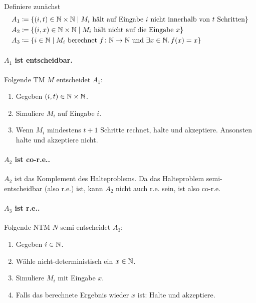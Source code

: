 
Definiere zunächst
\begin{align*}
  A_1 & \coloneqq \{ (i,t) \in \mathbb{N} \times \mathbb{N} \mid M_i\ \text{hält auf Eingabe}\ i\ \text{nicht innerhalb von}\ t\ \text{Schritten} \} \\
  A_2 & \coloneqq \{ (i,x) \in \mathbb{N} \times \mathbb{N} \mid M_i\ \text{hält nicht auf die Eingabe}\ x\} \\
  A_3 & \coloneqq \{ i \in \mathbb{N} \mid M_i\ \text{berechnet}\ f
        \colon \mathbb{N} \to \mathbb{N}\ \text{und}\ \exists x \in
        \mathbb{N} .\, f(x) = x \}
\end{align*}

\paragraph{$A_1$ ist entscheidbar.}
Folgende TM $M$ entscheidet $A_1$:
\begin{enumerate}
	\item
		Gegeben $(i,t) \in \mathbb{N} \times \mathbb{N}$.
	\item
		Simuliere $M_i$ auf Eingabe $i$.
	\item
		Wenn $M_i$ mindestens $t+1$ Schritte rechnet, halte und
		akzeptiere. Ansonsten halte und akzeptiere nicht.
\end{enumerate}
\par

\paragraph{$A_2$ ist co-r.e..}
$A_2$ ist das Komplement des Halteproblems. Da das Halteproblem
semi-entscheidbar (also r.e.) ist, kann $A_2$ nicht auch r.e. sein, ist also
co-r.e.
\par

\paragraph{$A_3$ ist r.e..}
Folgende NTM $N$ semi-entscheidet $A_3$:
\begin{enumerate}
	\item
		Gegeben $i \in \mathbb{N}$.
	\item
		Wähle nicht-deterministisch ein $x \in \mathbb{N}$.
	\item
		Simuliere $M_i$ mit Eingabe $x$.
	\item
		Falls das berechnete Ergebnis wieder $x$ ist: Halte und
		akzeptiere.
\end{enumerate}
\par

